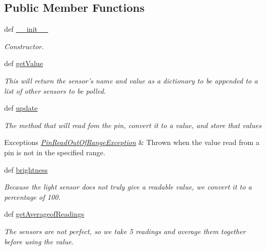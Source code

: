 \subsection*{Public Member Functions}
\begin{DoxyCompactItemize}
\item 
def \hyperlink{classsensing_1_1_light_sensor_a906bcf76dc955878006f8f72dc9e3105}{\-\_\-\-\_\-init\-\_\-\-\_\-}
\begin{DoxyCompactList}\small\item\em Constructor. \end{DoxyCompactList}\item 
def \hyperlink{classsensing_1_1_light_sensor_aab3cbdaa280ccafb57e62e918940cb89}{get\-Value}
\begin{DoxyCompactList}\small\item\em This will return the sensor's name and value as a dictionary to be appended to a list of other sensors to be polled. \end{DoxyCompactList}\item 
def \hyperlink{classsensing_1_1_light_sensor_add45ebed39d38396dff214a90c6d814a}{update}
\begin{DoxyCompactList}\small\item\em The method that will read fom the pin, convert it to a value, and store that values 
\begin{DoxyExceptions}{Exceptions}
{\em \hyperlink{classsensing_1_1_pin_read_out_of_range_exception}{Pin\-Read\-Out\-Of\-Range\-Exception}} & Thrown when the value read from a pin is not in the specified range. \\
\hline
\end{DoxyExceptions}
\end{DoxyCompactList}\item 
def \hyperlink{classsensing_1_1_light_sensor_a18d4850e295f7154bf3ff99c95c7ada6}{brightness}
\begin{DoxyCompactList}\small\item\em Because the light sensor does not truly give a readable value, we convert it to a percentage of 100. \end{DoxyCompactList}\item 
def \hyperlink{classsensing_1_1_light_sensor_aaf57806c085727f8ec922b5baa5c1f3b}{get\-Averageof\-Readings}
\begin{DoxyCompactList}\small\item\em The sensors are not perfect, so we take 5 readings and average them together before using the value. \end{DoxyCompactList}\end{DoxyCompactItemize}


